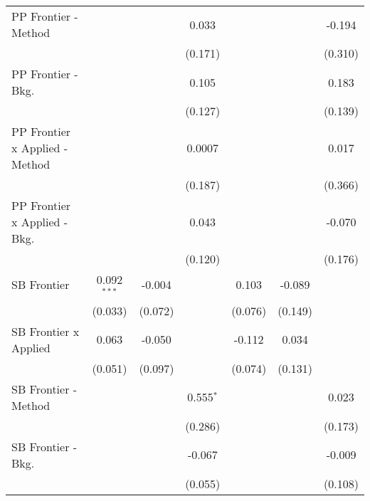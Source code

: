 \begin{tabular}{lcccccc}
   PP Frontier - Method           &               &              & 0.033          &               &             & -0.194\\   
                                  &               &              & (0.171)        &               &             & (0.310)\\   
   PP Frontier - Bkg.             &               &              & 0.105          &               &             & 0.183\\   
                                  &               &              & (0.127)        &               &             & (0.139)\\   
   PP Frontier x Applied - Method &               &              & 0.0007         &               &             & 0.017\\   
                                  &               &              & (0.187)        &               &             & (0.366)\\   
   PP Frontier x Applied - Bkg.   &               &              & 0.043          &               &             & -0.070\\   
                                  &               &              & (0.120)        &               &             & (0.176)\\   
   SB Frontier                    & 0.092$^{***}$ & -0.004       &                & 0.103         & -0.089      &   \\   
                                  & (0.033)       & (0.072)      &                & (0.076)       & (0.149)     &   \\   
   SB Frontier x Applied          & 0.063         & -0.050       &                & -0.112        & 0.034       &   \\   
                                  & (0.051)       & (0.097)      &                & (0.074)       & (0.131)     &   \\   
   SB Frontier - Method           &               &              & 0.555$^{*}$    &               &             & 0.023\\   
                                  &               &              & (0.286)        &               &             & (0.173)\\   
   SB Frontier - Bkg.             &               &              & -0.067         &               &             & -0.009\\   
                                  &               &              & (0.055)        &               &             & (0.108)\\   

\end{tabular}
